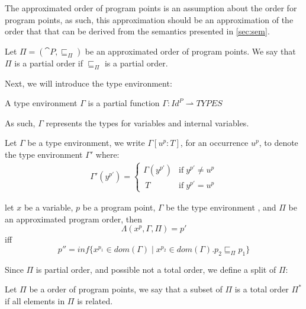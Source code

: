 \documentclass[../../master.tex]{subfiles}
\begin{document}
The approximated order of program points is an assumption about the order for program points, as such, this approximation should be an approximation of the order that that can be derived from the semantics presented in \cref{sec:sem}.

\begin{definition}
	Let $\Pi=(\cat{P},\sqsubseteq_\Pi)$ be an approximated order of program points.
	We say that $\Pi$ is a partial order if $\sqsubseteq_\Pi$ is a partial order.
\end{definition}
\bigskip

Next, we will introduce the type environment:
\begin{definition}
	A type environment $\Gamma$ is a partial function $\Gamma:Id^P\rightharpoonup TYPES$
\end{definition}
As such, $\Gamma$ represents the types for variables and internal variables.

\begin{definition}
	Let $\Gamma$ be a type environment, we write $\Gamma[u^p:T]$, for an occurrence $u^p$, to denote the type environment $\Gamma'$ where:
	\begin{align*}
		\Gamma'(y^{p'})=
		\left\{\begin{matrix}
			\Gamma(y^{p'}) & \mbox{if}\;y^{p'}\neq u^{p}\\\	 
			T & \mbox{if}\;y^{p'}=u^{p}
		\end{matrix}\right.
	\end{align*}

\end{definition}

\iffalse
\begin{definition}
	let $x$ be a variable, $p$ be a program point, $\Gamma$ be the type environment , and $\Pi$ be an approximated program order, then
	$$\Lambda(x^p, \Gamma, \Pi)=p'$$
	iff
	$$p'' = inf\{x^{p_1}\in dom(\Gamma)\mid x^{p_2}\in dom(\Gamma).p_2\sqsubseteq_\Pi p_1\}$$
\end{definition}

Since $\Pi$ is partial order, and possible not a total order, we define a split of $\Pi$:

\begin{definition}
	Let $\Pi$ be a order of program points, we say that a subset of $\Pi$ is a total order $\Pi^{*}$ if all elements in $\Pi$ is related.
\end{definition}
\end{document}
